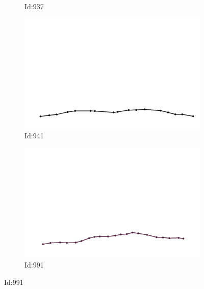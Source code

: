 \documentclass[12pt,twoside]{report}
\begin{document}
\begin{figure}
\begin{subfigure}[b]{0.20\textwidth}
\caption{Id:937}
\end{subfigure}
\begin{subfigure}[b]{0.20\textwidth}
\centering
\includegraphics[width=\textwidth]{../trajectories/941.png}
\caption{Id:941}
\end{subfigure}
\begin{subfigure}[b]{0.20\textwidth}
\centering
\includegraphics[width=\textwidth]{../trajectories/991.png}
\caption{Id:991}
\end{subfigure}
\end{figure}
\end{document}

